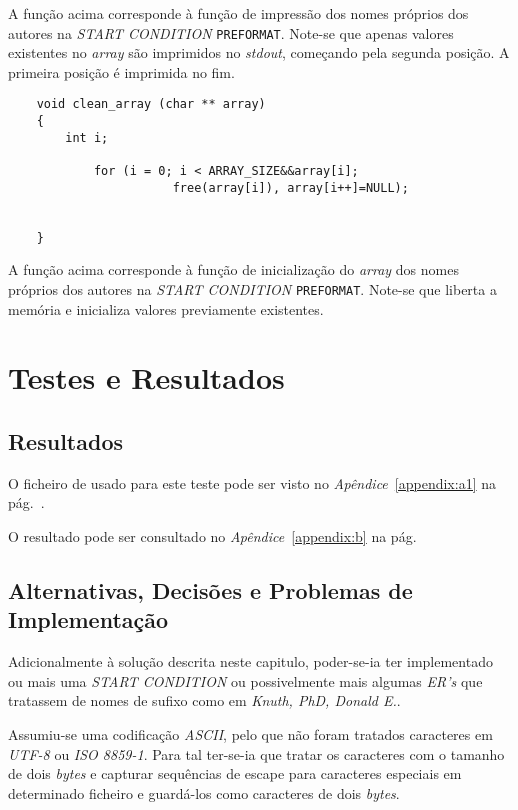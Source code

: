 A função acima corresponde à função de impressão dos nomes próprios dos autores
na \emph{START CONDITION} \texttt{PREFORMAT}. Note-se que apenas valores
existentes no \emph{array} são imprimidos no \emph{stdout}, começando pela
segunda posição. A primeira posição é imprimida no fim.

\begin{Verbatim}
	void clean_array (char ** array)
	{
	    int i;
		
			for (i = 0; i < ARRAY_SIZE&&array[i]; 
			           free(array[i]), array[i++]=NULL);
			
			
	}

\end{Verbatim}

A função acima corresponde à função de inicialização do \emph{array} dos nomes
próprios dos autores na \emph{START CONDITION} \texttt{PREFORMAT}. Note-se que
liberta a memória e inicializa valores previamente existentes.


\section{Testes e Resultados}
\subsection{Resultados}
\label{sec:ts:b1}

O ficheiro de usado para este teste pode ser visto no
\emph{Apêndice}~\ref{appendix:a1} na pág.~\pageref{appendix:a1}. 

O resultado pode ser consultado no \emph{Apêndice}~\ref{appendix:b} na
pág.~\pageref{appendix:b}

\subsection{Alternativas, Decisões e Problemas de Implementação}

Adicionalmente à solução descrita neste capitulo, poder-se-ia ter implementado
ou mais uma \emph{START CONDITION} ou possivelmente mais algumas \emph{ER's}
que tratassem de nomes de sufixo como em  \emph{Knuth, PhD, Donald E.}.

Assumiu-se uma codificação \emph{ASCII}, pelo que não foram tratados caracteres
em \emph{UTF-8} ou \emph{ISO 8859-1}. Para tal ter-se-ia que tratar os
caracteres com o tamanho de dois \emph{bytes} e capturar sequências de escape
para caracteres especiais em determinado ficheiro  e guardá-los
como caracteres de dois \emph{bytes}. 







